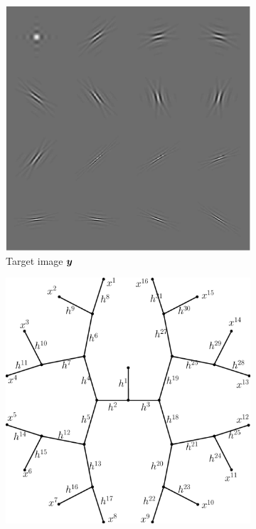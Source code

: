 \begin{figure}[!ht] \centering
\begin{subfigure}[b]{0.325\textwidth}\centering
\includegraphics[width=\textwidth]{figures/tree-learn-setup/target.pdf} 
	\caption{Target image $\bm{y}$}\label{fig_learntree_setup-target}
\end{subfigure}
\begin{subfigure}[b]{0.325\textwidth}\centering
\includegraphics[width=\textwidth]{figures/tree-learn-setup/tree.pdf}

\end{subfigure}
\end{figure}

